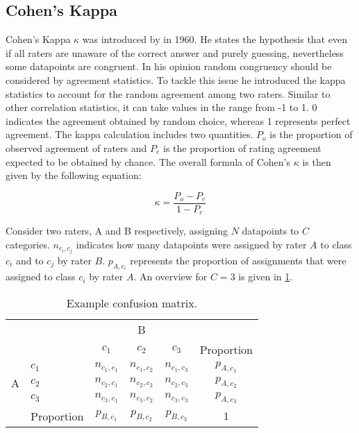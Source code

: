 \subsection{Cohen's Kappa}
\label{chp:fundamentals:sec:inter_rater_agreement:subsec:cohens_kappa}
Cohen's Kappa $\kappa$ was introduced by \textcite{Cohen:1960} in 1960.
He states the hypothesis that even if all raters are unaware of the correct answer and purely guessing, nevertheless some datapoints are congruent.
In his opinion random congruency should be considered by agreement statistics.
To tackle this issue he introduced the kappa statistics to account for the random agreement among two raters.
Similar to other correlation statistics, it can take values in the range from -1 to 1.
0 indicates the agreement obtained by random choice, whereas 1 represents perfect agreement.
The kappa calculation includes two quantities.
$P_o$ is the proportion of observed agreement of raters and $P_e$ is the proportion of rating agreement expected to be obtained by chance.
The overall formula of Cohen's $\kappa$ is then given by the following equation:

\begin{equation}\label{eq:Cohens_kappa}
    \kappa = \frac{P_o - P_e}{1 - P_e}
\end{equation}

Consider two raters, A and B respectively, assigning $N$ datapoints to $C$ categories.
$n_{c_i, c_j}$ indicates how many datapoints were assigned by rater $A$ to class $c_i$ and to $c_j$ by rater $B$.
$p_{A, c_i}$ represents the proportion of assignments that were assigned to class $c_i$ by rater $A$.
An overview for $C=3$ is given in \cref{tab:cohens_kappa_sample_definition}.

\begin{table}[htpb]
    \centering
    \begin{tabular}{l|l|c|c|c|c}
        \multicolumn{2}{c}{}&\multicolumn{3}{c}{B}&\\
        \cline{3-5}
        \multicolumn{2}{c|}{}&$c_1$&$c_2$&$c_3$&\multicolumn{1}{c}{Proportion}\\
        \cline{2-5}
        \multirow{3}{*}{A}& $c_1$ & $n_{c_1, c_1}$ & $n_{c_1, c_2}$ &$n_{c_1, c_3}$& $p_{A, c_1}$\\
        \cline{2-5}
        & $c_2$ & $n_{c_2, c_1}$ & $n_{c_2, c_2}$ &$n_{c_2, c_3}$&$p_{A, c_2}$\\
        \cline{2-5}
        & $c_3$ & $n_{c_3, c_1}$ & $n_{c_3, c_2}$ &$n_{c_3, c_3}$ & $p_{A, c_3}$\\
        \cline{2-5}
        \multicolumn{1}{c}{} & \multicolumn{1}{c}{Proportion} & \multicolumn{1}{c}{$p_{B, c_1}$} & \multicolumn{1}{c}{$p_{B, c_2}$} & \multicolumn{1}{c}{$p_{B, c_3}$} & \multicolumn{1}{c}{$1$}\\
    \end{tabular}
    \caption[Cohen's Kappa notation overview]{Example confusion matrix.}\label{tab:cohens_kappa_sample_definition}
\end{table}


